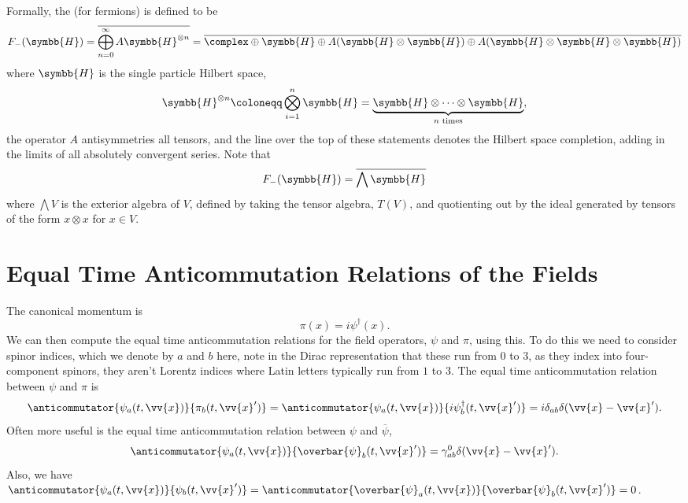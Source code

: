 \documentclass[fleqn]{NotesClass}
\newcommand{\hermit}{{\dagger}}
\newcommand{\hilbertSpace}{\symbb{H}}
\newcommand{\diracadjoint}[1]{\overbar{#1}}
\begin{document}
    Formally, the  (for fermions) is defined to be
    \begin{equation}
        F_{-}(\hilbertSpace) = \overline{\bigoplus_{n=0}^{\infty} A \hilbertSpace^{\otimes n}} = \overline{\complex \oplus \hilbertSpace \oplus A(\hilbertSpace \otimes \hilbertSpace) \oplus A(\hilbertSpace \otimes \hilbertSpace \otimes \hilbertSpace)}
    \end{equation}
    where \(\hilbertSpace\) is the single particle Hilbert space,
    \begin{equation}
        \hilbertSpace^{\otimes n} \coloneqq \bigotimes_{i=1}^n \hilbertSpace = \underbrace{\hilbertSpace \otimes \dotsb \otimes \hilbertSpace}_{n \text{ times}},
    \end{equation}
    the operator \(A\) antisymmetries all tensors, and the line over the top of these statements denotes the Hilbert space completion, adding in the limits of all absolutely convergent series.
    Note that
    \begin{equation}
        F_-(\hilbertSpace) = \overline{\bigwedge \hilbertSpace}
    \end{equation}
    where \(\bigwedge V\) is the exterior algebra of \(V\), defined by taking the tensor algebra, \(T(V)\), and quotienting out by the ideal generated by tensors of the form \(x \otimes x\) for \(x \in V\).
   
   \section{Equal Time Anticommutation Relations of the Fields}
   The canonical momentum is
   \begin{equation}
       \pi(x) = i\psi^\hermit(x).
   \end{equation}
    We can then compute the equal time anticommutation relations for the field operators, \(\psi\) and \(\pi\), using this.
    To do this we need to consider spinor indices, which we denote by \(a\) and \(b\) here, note in the Dirac representation that these run from \(0\) to \(3\), as they index into four-component spinors, they aren't Lorentz indices where Latin letters typically run from \(1\) to \(3\).
    The equal time anticommutation relation between \(\psi\) and \(\pi\) is
    \begin{equation}
        \anticommutator{\psi_a(t, \vv{x})}{\pi_b(t, \vv{x}')} = \anticommutator{\psi_a(t, \vv{x})}{i\psi_b^\hermit(t, \vv{x}')} = i\delta_{ab} \delta(\vv{x} - \vv{x}').
    \end{equation}
    Often more useful is the equal time anticommutation relation between \(\psi\) and \(\diracadjoint{\psi}\),
    \begin{equation}
        \anticommutator{\psi_a(t, \vv{x})}{\diracadjoint{\psi}_b(t, \vv{x}')} = \gamma^0_{ab} \delta(\vv{x} - \vv{x}').
    \end{equation}
    Also, we have \(\anticommutator{\psi_a(t, \vv{x})}{\psi_b(t, \vv{x}')} = \anticommutator{\diracadjoint{\psi}_a(t, \vv{x})}{\diracadjoint{\psi}_b(t, \vv{x}')} = 0\).
    
\end{document}
